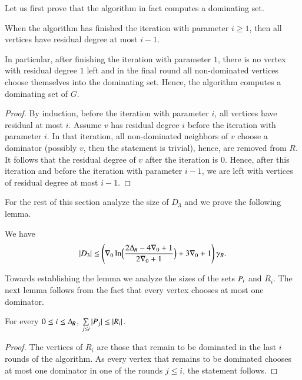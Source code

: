\smallskip
Let us first prove that the algorithm in fact computes a dominating set.
\begin{lemma}\label{lem:correctness-general}
  When the algorithm has finished the iteration with parameter
  $i\geq 1$, then all vertices have residual degree at most $i-1$.
\end{lemma}

In particular, after finishing the iteration with parameter $1$, there
is no vertex with residual degree $1$ left and in the final round all
non-dominated vertices choose themselves into the dominating
set. Hence, the algorithm computes a dominating set of $G$.

\begin{proof}
  By induction, before the iteration with parameter $i$, all vertices
  have residual at most $i$. Assume $v$ has residual degree $i$ before
  the iteration with parameter $i$.  In that iteration, all
  non-dominated neighbors of $v$ choose a dominator (possibly $v$, then
  the statement is trivial),
  hence, are removed from $R$. It follows that the residual degree of $v$ after
  the iteration is $0$. Hence, after this iteration and before the
  iteration with parameter $i-1$, we are left with vertices of
  residual degree at most $i-1$.
\end{proof}

For the rest of this section analyze the size of $D_3$ and
we prove the following lemma.

\begin{lemma}\label{lem:greedy-approx}
 We have
 \[
 |D_3|\leq \left(\nabla_0\ln\Bigl(\frac{2{\Delta_{\hspace{-1pt}R}}-4\nabla_0+1}{2\nabla_0+1}\Bigr)+3\nabla_0+1\right)\gamma_R.
 \]
\end{lemma}

Towards establishing the lemma we analyze the sizes of the sets
$P_i$ and $R_i$. The next
lemma follows from the fact that every vertex chooses at most one
dominator.

\begin{lemma}\label{lem:total-h}
  For every $0\leq i\le {\Delta_{\hspace{-1pt}R}}$, $\sum\limits_{j\le i}|P_j| \le |R_i|$.
\end{lemma}
\begin{proof}
  The vertices of $R_i$ are those that remain to be dominated in the
  last $i$ rounds of the algorithm. As every vertex that remains to be
  dominated chooses at most one dominator in one of the rounds
  $j\leq i$, the statement follows.
\end{proof}


